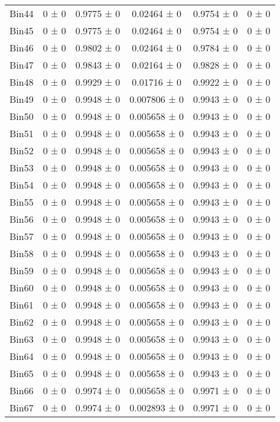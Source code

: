 \begin{tabular}{@{\extracolsep{4pt}}lccccc@{}}
     Bin44 & 0 ± 0 & 0.9775 ± 0 & 0.02464 ± 0 & 0.9754 ± 0 & 0 ± 0 \\ 
     Bin45 & 0 ± 0 & 0.9775 ± 0 & 0.02464 ± 0 & 0.9754 ± 0 & 0 ± 0 \\ 
     Bin46 & 0 ± 0 & 0.9802 ± 0 & 0.02464 ± 0 & 0.9784 ± 0 & 0 ± 0 \\ 
     Bin47 & 0 ± 0 & 0.9843 ± 0 & 0.02164 ± 0 & 0.9828 ± 0 & 0 ± 0 \\ 
     Bin48 & 0 ± 0 & 0.9929 ± 0 & 0.01716 ± 0 & 0.9922 ± 0 & 0 ± 0 \\ 
     Bin49 & 0 ± 0 & 0.9948 ± 0 & 0.007806 ± 0 & 0.9943 ± 0 & 0 ± 0 \\ 
     Bin50 & 0 ± 0 & 0.9948 ± 0 & 0.005658 ± 0 & 0.9943 ± 0 & 0 ± 0 \\ 
     Bin51 & 0 ± 0 & 0.9948 ± 0 & 0.005658 ± 0 & 0.9943 ± 0 & 0 ± 0 \\ 
     Bin52 & 0 ± 0 & 0.9948 ± 0 & 0.005658 ± 0 & 0.9943 ± 0 & 0 ± 0 \\ 
     Bin53 & 0 ± 0 & 0.9948 ± 0 & 0.005658 ± 0 & 0.9943 ± 0 & 0 ± 0 \\ 
     Bin54 & 0 ± 0 & 0.9948 ± 0 & 0.005658 ± 0 & 0.9943 ± 0 & 0 ± 0 \\ 
     Bin55 & 0 ± 0 & 0.9948 ± 0 & 0.005658 ± 0 & 0.9943 ± 0 & 0 ± 0 \\ 
     Bin56 & 0 ± 0 & 0.9948 ± 0 & 0.005658 ± 0 & 0.9943 ± 0 & 0 ± 0 \\ 
     Bin57 & 0 ± 0 & 0.9948 ± 0 & 0.005658 ± 0 & 0.9943 ± 0 & 0 ± 0 \\ 
     Bin58 & 0 ± 0 & 0.9948 ± 0 & 0.005658 ± 0 & 0.9943 ± 0 & 0 ± 0 \\ 
     Bin59 & 0 ± 0 & 0.9948 ± 0 & 0.005658 ± 0 & 0.9943 ± 0 & 0 ± 0 \\ 
     Bin60 & 0 ± 0 & 0.9948 ± 0 & 0.005658 ± 0 & 0.9943 ± 0 & 0 ± 0 \\ 
     Bin61 & 0 ± 0 & 0.9948 ± 0 & 0.005658 ± 0 & 0.9943 ± 0 & 0 ± 0 \\ 
     Bin62 & 0 ± 0 & 0.9948 ± 0 & 0.005658 ± 0 & 0.9943 ± 0 & 0 ± 0 \\ 
     Bin63 & 0 ± 0 & 0.9948 ± 0 & 0.005658 ± 0 & 0.9943 ± 0 & 0 ± 0 \\ 
     Bin64 & 0 ± 0 & 0.9948 ± 0 & 0.005658 ± 0 & 0.9943 ± 0 & 0 ± 0 \\ 
     Bin65 & 0 ± 0 & 0.9948 ± 0 & 0.005658 ± 0 & 0.9943 ± 0 & 0 ± 0 \\ 
     Bin66 & 0 ± 0 & 0.9974 ± 0 & 0.005658 ± 0 & 0.9971 ± 0 & 0 ± 0 \\ 
     Bin67 & 0 ± 0 & 0.9974 ± 0 & 0.002893 ± 0 & 0.9971 ± 0 & 0 ± 0 \\ 

\end{tabular}
